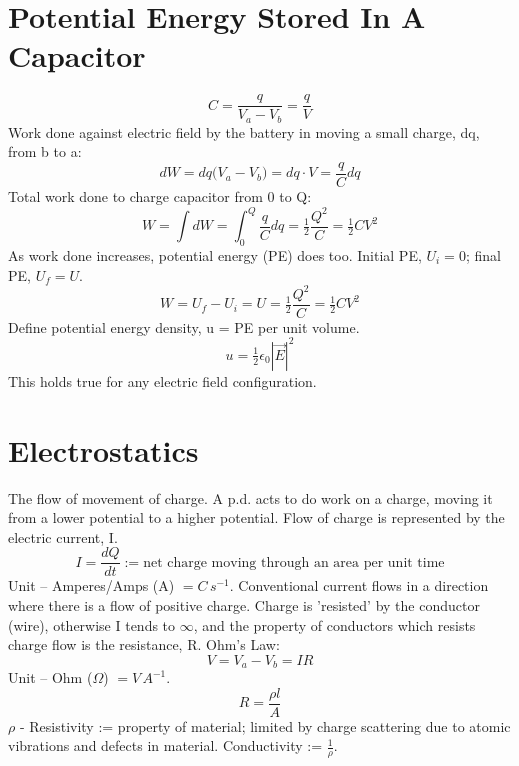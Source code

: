 \documentclass[a4paper, 11pt, normalem]{report}
\begin{document}
\section{Potential Energy Stored In A Capacitor}
\begin{equation}
    C = \frac{q}{V_{a} - V_{b}} = \frac{q}{V}
\end{equation}
Work done against electric field by the battery in moving a small charge, dq, from b to a:
\begin{equation}
    dW = dq\big(V_{a} - V_{b}\big) = dq \cdot V = \frac{q}{C}dq
\end{equation}
Total work done to charge capacitor from 0 to Q:
\begin{equation}
    W = \int dW = \int_{0}^{Q} \frac{q}{C} dq = \tfrac{1}{2} \frac{Q^{2}}{C} = \tfrac{1}{2}CV^{2}
\end{equation}
As work done increases, potential energy (PE) does too. Initial PE, $U_{i} = 0$; final PE, $U_{f} = U$.
\begin{equation}
    W = U_{f} - U_{i} = U = \tfrac{1}{2}\frac{Q^{2}}{C} = \tfrac{1}{2}CV^{2}
\end{equation}
Define potential energy density, u = PE per unit volume.
\begin{equation}
    u = \tfrac{1}{2}\epsilon_{0}|\vec{E}|^{2}
\end{equation}
This holds true for any electric field configuration.

\section{Electrostatics}
The flow of movement of charge.
A p.d. acts to do work on a charge, moving it from a lower potential to a higher potential.
Flow of charge is represented by the electric current, I.
\begin{equation}
    I = \frac{dQ}{dt} := \text{net charge moving through an area per unit time}
\end{equation}
Unit -- Amperes/Amps (A) $= C\,s^{-1}$.
Conventional current flows in a direction where there is a flow of positive charge.
Charge is 'resisted' by the conductor (wire), otherwise I tends to $\infty$, and the property of conductors which resists charge flow is the resistance, R.
Ohm's Law:
\begin{equation}
    V = V_{a} - V_{b} = IR
\end{equation}
Unit -- Ohm ($\Omega$) $= V\,A^{-1}$.
\begin{equation}
    R = \frac{\rho l}{A}
\end{equation}
$\rho$ - Resistivity := property of material; limited by charge scattering due to atomic vibrations and defects in material.
Conductivity := $\frac{1}{\rho}$.
\end{document}
